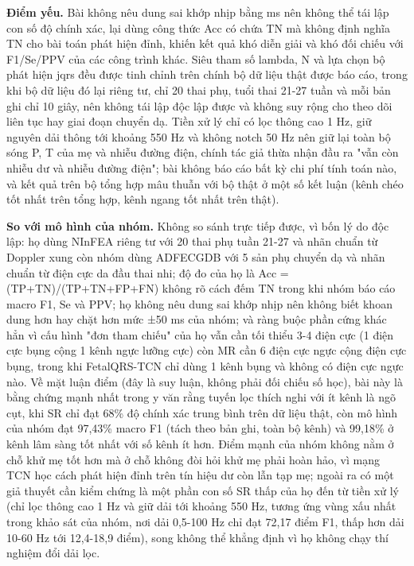 \documentclass[12pt,a4paper]{article}
\begin{document}
\noindent \textbf{Điểm yếu.} Bài không nêu dung sai khớp nhịp bằng ms nên không thể tái lập con số độ chính xác, lại dùng công thức Acc có chứa TN mà không định nghĩa TN cho bài toán phát hiện đỉnh, khiến kết quả khó diễn giải và khó đối chiếu với F1/Se/PPV của các công trình khác. Siêu tham số lambda, N và lựa chọn bộ phát hiện jqrs đều được tinh chỉnh trên chính bộ dữ liệu thật được báo cáo, trong khi bộ dữ liệu đó lại riêng tư, chỉ 20 thai phụ, tuổi thai 21-27 tuần và mỗi bản ghi chỉ 10 giây, nên không tái lập độc lập được và không suy rộng cho theo dõi liên tục hay giai đoạn chuyển dạ. Tiền xử lý chỉ có lọc thông cao 1 Hz, giữ nguyên dải thông tới khoảng 550 Hz và không notch 50 Hz nên giữ lại toàn bộ sóng P, T của mẹ và nhiễu đường điện, chính tác giả thừa nhận đầu ra "vẫn còn nhiễu dư và nhiễu đường điện"; bài không báo cáo bất kỳ chi phí tính toán nào, và kết quả trên bộ tổng hợp mâu thuẫn với bộ thật ở một số kết luận (kênh chéo tốt nhất trên tổng hợp, kênh ngang tốt nhất trên thật).\par\vspace{3pt}
\noindent \textbf{\color{tdtblue}So với mô hình của nhóm.} Không so sánh trực tiếp được, vì bốn lý do độc lập: họ dùng NInFEA riêng tư với 20 thai phụ tuần 21-27 và nhãn chuẩn từ Doppler xung còn nhóm dùng ADFECGDB với 5 sản phụ chuyển dạ và nhãn chuẩn từ điện cực da đầu thai nhi; độ đo của họ là Acc = (TP+TN)/(TP+TN+FP+FN) không rõ cách đếm TN trong khi nhóm báo cáo macro F1, Se và PPV; họ không nêu dung sai khớp nhịp nên không biết khoan dung hơn hay chặt hơn mức ±50 ms của nhóm; và ràng buộc phần cứng khác hẳn vì cấu hình "đơn tham chiếu" của họ vẫn cần tối thiểu 3-4 điện cực (1 điện cực bụng cộng 1 kênh ngực lưỡng cực) còn MR cần 6 điện cực ngực cộng điện cực bụng, trong khi FetalQRS-TCN chỉ dùng 1 kênh bụng và không có điện cực ngực nào. Về mặt luận điểm (đây là suy luận, không phải đối chiếu số học), bài này là bằng chứng mạnh nhất trong y văn rằng tuyến lọc thích nghi với ít kênh là ngõ cụt, khi SR chỉ đạt 68\% độ chính xác trung bình trên dữ liệu thật, còn mô hình của nhóm đạt 97,43\% macro F1 (tách theo bản ghi, toàn bộ kênh) và 99,18\% ở kênh lâm sàng tốt nhất với số kênh ít hơn. Điểm mạnh của nhóm không nằm ở chỗ khử mẹ tốt hơn mà ở chỗ không đòi hỏi khử mẹ phải hoàn hảo, vì mạng TCN học cách phát hiện đỉnh trên tín hiệu dư còn lẫn tạp mẹ; ngoài ra có một giả thuyết cần kiểm chứng là một phần con số SR thấp của họ đến từ tiền xử lý (chỉ lọc thông cao 1 Hz và giữ dải tới khoảng 550 Hz, tương ứng vùng xấu nhất trong khảo sát của nhóm, nơi dải 0,5-100 Hz chỉ đạt 72,17 điểm F1, thấp hơn dải 10-60 Hz tới 12,4-18,9 điểm), song không thể khẳng định vì họ không chạy thí nghiệm đổi dải lọc.\par\vspace{3pt}
\end{document}
